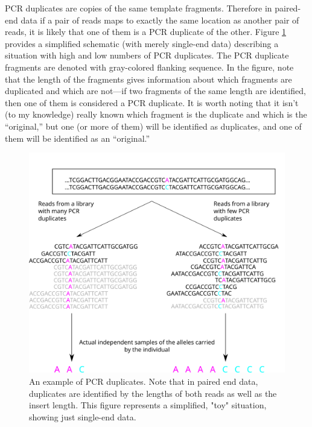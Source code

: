 \documentclass[]{krantz}
\begin{document}
PCR duplicates are copies of the same template fragments. Therefore in paired-end data
if a pair of reads maps to exactly the same location as another pair of reads, it is likely
that one of them is a PCR duplicate of the other.
Figure \ref{fig:pcr-duplicates} provides a simplified schematic (with merely
single-end data) describing a situation with high and
low numbers of PCR duplicates. The PCR duplicate fragments are denoted with gray-colored
flanking sequence. In the figure, note that the length of the fragments gives
information about which fragments are duplicated and which are not---if two fragments of the
same length are identified, then one of them is considered a PCR duplicate. It is worth
noting that it isn't (to my knowledge) really known which fragment is the
duplicate and which is the ``original,'' but one (or more of them) will be identified
as duplicates, and one of them will be identified as an ``original.''

\begin{figure}

{\centering \includegraphics{figs/pcr-duplicates} 

}

\caption{An example of PCR duplicates.  Note that in paired end data, duplicates are identified by the lengths of both reads as well as the insert length.  This figure represents a simplified, "toy" situation, showing just single-end data.}\label{fig:pcr-duplicates}
\end{figure}
\end{document}
